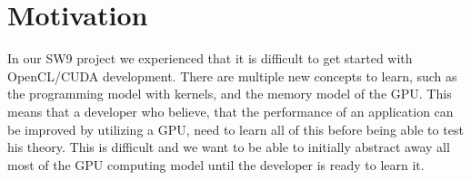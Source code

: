 \section{Motivation}\label{cha:motivation}
In our SW9 project we experienced that it is difficult to get started with OpenCL/CUDA development. There are multiple new concepts to learn, such as the programming model with kernels, and the memory model of the GPU. This means that a developer who believe, that the performance of an application can be improved by utilizing a GPU, need to learn all of this before being able to test his theory. This is difficult and we want to be able to initially abstract away all most of the GPU computing model until the developer is ready to learn it.

